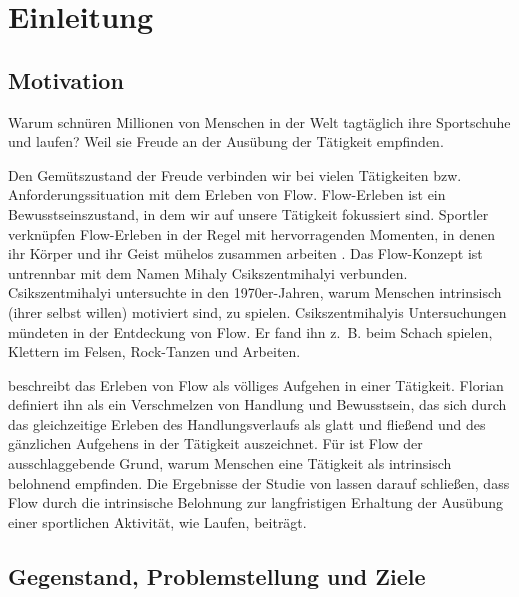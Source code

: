 

\chapter{Einleitung} 

\label{cha:einleitung}

\section{Motivation} 

\label{sec:motivation}

Warum schnüren Millionen von Menschen in der Welt tagtäglich ihre Sportschuhe und laufen? Weil sie Freude an der Ausübung der Tätigkeit empfinden.

Den Gemütszustand der Freude verbinden wir bei vielen Tätigkeiten bzw. Anforderungssituation mit dem Erleben von Flow. Flow-Erleben ist ein Bewusstseinszustand, in dem wir auf unsere Tätigkeit fokussiert sind. Sportler verknüpfen Flow-Erleben in der Regel mit hervorragenden Momenten, in denen ihr Körper und ihr Geist mühelos zusammen arbeiten \citep[S.~5]{Jackson1999}. Das Flow-Konzept ist untrennbar mit dem Namen Mihaly Csikszentmihalyi verbunden. Csikszentmihalyi untersuchte in den 1970er-Jahren, warum Menschen intrinsisch (ihrer selbst willen) motiviert sind, zu spielen. Csikszentmihalyis Untersuchungen mündeten in der Entdeckung von Flow. Er fand ihn z.~B. beim Schach spielen, Klettern im Felsen, Rock-Tanzen und Arbeiten.

\citet[][S.~58~f.]{Csikszentmihalyi2010} beschreibt das Erleben von Flow als völliges Aufgehen in einer Tätigkeit. Florian \citet[][S.~13]{Henk2014} definiert ihn als ein Verschmelzen von Handlung und Bewusstsein, das sich durch das gleichzeitige Erleben des Handlungsverlaufs als glatt und fließend und des gänzlichen Aufgehens in der Tätigkeit auszeichnet. Für \citet[][S.~602]{Csikszentmihalyi2005} ist Flow der ausschlaggebende Grund, warum Menschen eine Tätigkeit als intrinsisch belohnend empfinden. Die Ergebnisse der Studie von \citet[][S.~174]{Schuler2009} lassen darauf schließen, dass Flow durch die intrinsische Belohnung zur langfristigen Erhaltung der Ausübung einer sportlichen Aktivität, wie Laufen, beiträgt.

\section{Gegenstand, Problemstellung und Ziele} 


